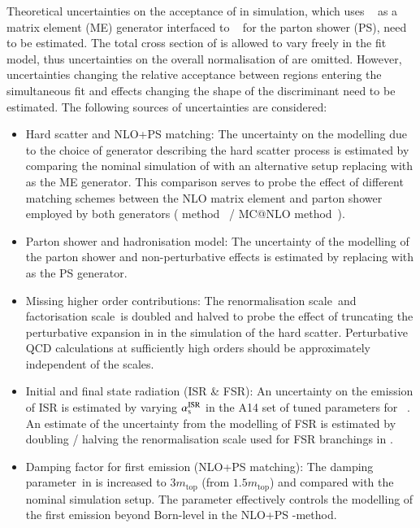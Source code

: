 Theoretical uncertainties on the acceptance of \ttbar in simulation,
which uses \POWHEGBOX[v2]~\cite{Frixione:2007nw} as a matrix element
(ME) generator interfaced to \PYTHIA[8.230]~\cite{Sjostrand:2014zea}
for the parton shower (PS), need to be estimated. The total cross
section of \ttbar is allowed to vary freely in the fit model, thus
uncertainties on the overall normalisation of \ttbar are
omitted. However, uncertainties changing the relative acceptance
between regions entering the simultaneous fit and effects changing the
shape of the \mTW discriminant need to be estimated. The following
sources of uncertainties are considered:
\begin{itemize}

\item Hard scatter and NLO+PS matching: The uncertainty on the
  modelling due to the choice of generator describing the hard scatter
  process is estimated by comparing the nominal simulation of \ttbar
  with an alternative setup replacing \POWHEGBOX[v2] with \MGNLO as
  the ME generator. This comparison serves to probe the effect of
  different matching schemes between the NLO matrix element and parton
  shower employed by both generators (\POWHEG
  method~\cite{Nason:2004rx,Frixione:2007vw,Alioli:2010xd} / MC@NLO
  method~\cite{Frixione:2002ik}).

\item Parton shower and hadronisation model: The uncertainty of the
  modelling of the parton shower and non-perturbative effects is
  estimated by replacing \PYTHIA[8] with \HERWIG[7.0.4] as the PS
  generator.

\item Missing higher order contributions: The renormalisation
  scale~\muR and factorisation scale~\muF is doubled and halved to
  probe the effect of truncating the perturbative expansion in \alphas
  in the simulation of the hard scatter. Perturbative QCD calculations
  at sufficiently high orders should be approximately independent of
  the scales.

\item Initial and final state radiation (ISR \& FSR): An uncertainty
  on the emission of ISR is estimated by varying $\alpha_{\text{s}}^\text{ISR}$
  in the A14 set of tuned parameters for
  \PYTHIA[8]~\cite{ATL-PHYS-PUB-2014-021}.
  An estimate of the uncertainty from the modelling of FSR is
  estimated by doubling / halving the renormalisation scale used for
  FSR branchings in \PYTHIA[8].

\item Damping factor for first emission (NLO+PS matching): The damping
  parameter~\hdamp in \POWHEGBOX[v2] is increased to
  $3 m_\text{top}$ (from $1.5 m_\text{top}$) and compared with the
  nominal simulation setup. The \hdamp parameter effectively
  controls the modelling of the first emission beyond Born-level in
  the NLO+PS \POWHEG-method.
\end{itemize}
